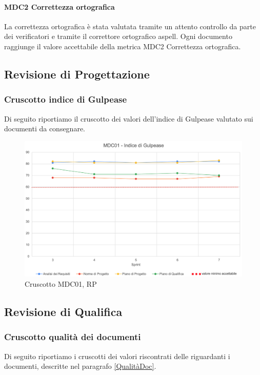 \paragraph{MDC2 Correttezza ortografica}

La correttezza ortografica è stata valutata tramite un attento controllo da parte dei verificatori e tramite il correttore ortografico aspell.  Ogni documento raggiunge il valore accettabile della metrica MDC2 Correttezza ortografica. 
\newpage{}
\subsection{Revisione di Progettazione}
\subsubsection{Cruscotto indice di Gulpease}

Di seguito riportiamo il cruscotto dei valori dell'indice di Gulpease valutato sui documenti da consegnare.

\begin{figure}[H]
    \centering
    \includegraphics[scale = 0.55]{immagini/GulpeaseRP.png}
    \caption{Cruscotto MDC01, RP}
\end{figure}

\newpage

\subsection{Revisione di Qualifica}
\subsubsection{Cruscotto qualità dei documenti}
Di seguito riportiamo i cruscotti dei valori riscontrati delle  riguardanti i documenti, descritte nel paragrafo \ref{QualitàDoc}.
